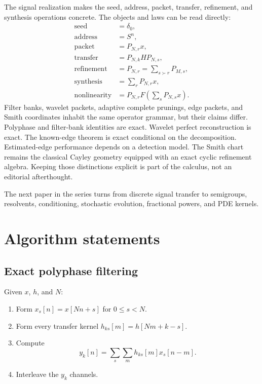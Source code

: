 \documentclass[11pt,a4paper]{article}
\theoremstyle{definition}
\theoremstyle{remark}
\begin{document}
The signal realization makes the seed, address, packet, transfer, refinement, and synthesis operations concrete. The objects and laws can be read directly:
\[
\boxed{
\begin{aligned}
\text{seed}&=\delta_0,\\
\text{address}&=S^n,\\
\text{packet}&=P_{N,r}x,\\
\text{transfer}&=P_{N,k}HP_{N,s},\\
\text{refinement}&=P_{N,r}=\sum_{s\succ r}P_{M,s},\\
\text{synthesis}&=\sum_rP_{N,r}x,\\
\text{nonlinearity}&=P_{N,r}F\left(\sum_sP_{N,s}x\right).
\end{aligned}
}
\]
Filter banks, wavelet packets, adaptive complete prunings, edge packets, and Smith coordinates inhabit the same operator grammar, but their claims differ. Polyphase and filter-bank identities are exact. Wavelet perfect reconstruction is exact. The known-edge theorem is exact conditional on the decomposition. Estimated-edge performance depends on a detection model. The Smith chart remains the classical Cayley geometry equipped with an exact cyclic refinement algebra. Keeping those distinctions explicit is part of the calculus, not an editorial afterthought.

The next paper in the series turns from discrete signal transfer to semigroups, resolvents, conditioning, stochastic evolution, fractional powers, and PDE kernels.

\appendix
\section{Algorithm statements}\label{core:section:18}

\subsection{Exact polyphase filtering}

Given $x$, $h$, and $N$:

\begin{enumerate}
\item Form $x_s[n]=x[Nn+s]$ for $0\le s<N$.
\item Form every transfer kernel $h_{ks}[m]=h[Nm+k-s]$.
\item Compute
\[
y_k[n]=\sum_s\sum_mh_{ks}[m]x_s[n-m].
\]
\item Interleave the $y_k$ channels.
\end{enumerate}
\end{document}
